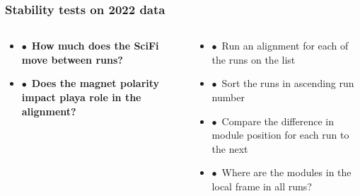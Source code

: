 \documentclass[aspectratio=1610, 12pt, xcolor=dvipsnames]{beamer}
\begin{document}
\begin{frame}\frametitle{Stability tests on 2022 data}
  \begin{columns}
    \begin{column}[c]{0.4\textwidth}
      \begin{itemize}
        \setlength\itemsep{1em}
        \item $\bullet$\, \textbf{How much does the SciFi move between runs?}
        \item $\bullet$\, \textbf{Does the magnet polarity impact playa role in the alignment?}
      \end{itemize}
    \end{column}
    \begin{column}[c]{0.6\textwidth}
      \begin{itemize}
        \item $\bullet$\, Run an alignment for each of the runs on the list
        \item $\bullet$\, Sort the runs in ascending run number
        \item $\bullet$\, Compare the difference in module position for each run to the next
        \item $\bullet$\, Where are the modules in the local frame in all runs?
      \end{itemize}
    \end{column}
  \end{columns}
\end{frame}
\end{document}
